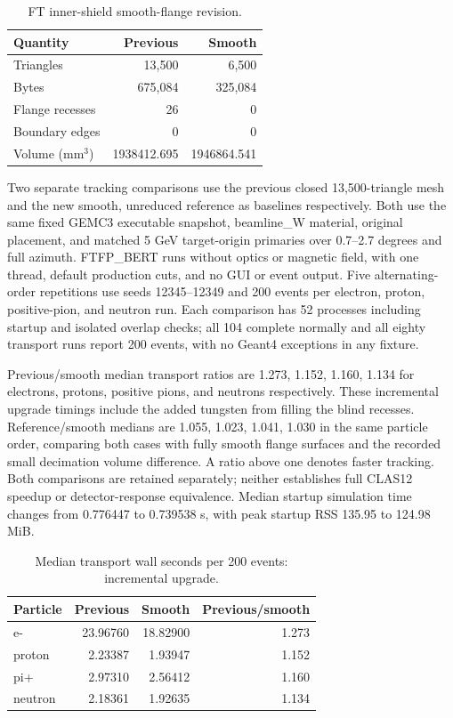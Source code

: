 \begin{table}[htbp]
\centering
\caption{FT inner-shield smooth-flange revision.}
\label{tab:ft-shield-smooth-mesh}
\begin{tabular}{lrr}
\toprule
Quantity & Previous & Smooth \\
\midrule
Triangles & 13,500 & 6,500 \\
Bytes & 675,084 & 325,084 \\
Flange recesses & 26 & 0 \\
Boundary edges & 0 & 0 \\
Volume (mm$^3$) & 1938412.695 & 1946864.541 \\
\bottomrule
\end{tabular}
\end{table}

Two separate tracking comparisons use the previous closed 13,500-triangle mesh and the new smooth, unreduced
reference as baselines respectively. Both use the same fixed GEMC3 executable snapshot, beamline\_W
material, original placement, and matched 5 GeV target-origin primaries over 0.7--2.7 degrees and full
azimuth. FTFP\_BERT runs without optics or magnetic field, with one thread, default production cuts, and no
GUI or event output. Five alternating-order repetitions use seeds 12345--12349 and 200 events per electron,
proton, positive-pion, and neutron run. Each comparison has 52 processes including startup and isolated
overlap checks; all 104 complete normally and all eighty transport runs report 200 events, with no Geant4
exceptions in any fixture.

Previous/smooth median transport ratios are 1.273, 1.152, 1.160, 1.134 for electrons, protons, positive
pions, and neutrons respectively. These incremental upgrade timings include the added tungsten from filling
the blind recesses. Reference/smooth medians are 1.055, 1.023, 1.041, 1.030 in the same particle order,
comparing both cases with fully smooth flange surfaces and the recorded small decimation volume difference.
A ratio above one denotes faster tracking. Both comparisons are retained separately; neither establishes
full CLAS12 speedup or detector-response equivalence. Median startup simulation time changes from 0.776447
to 0.739538 s, with peak startup RSS 135.95 to 124.98 MiB.

\begin{table}[htbp]
\centering
\caption{Median transport wall seconds per 200 events: incremental upgrade.}
\label{tab:ft-shield-smooth-upgrade}
\begin{tabular}{lrrr}
\toprule
Particle & Previous & Smooth & Previous/smooth \\
\midrule
e- & 23.96760 & 18.82900 & 1.273 \\
proton & 2.23387 & 1.93947 & 1.152 \\
pi+ & 2.97310 & 2.56412 & 1.160 \\
neutron & 2.18361 & 1.92635 & 1.134 \\
\bottomrule
\end{tabular}
\end{table}

